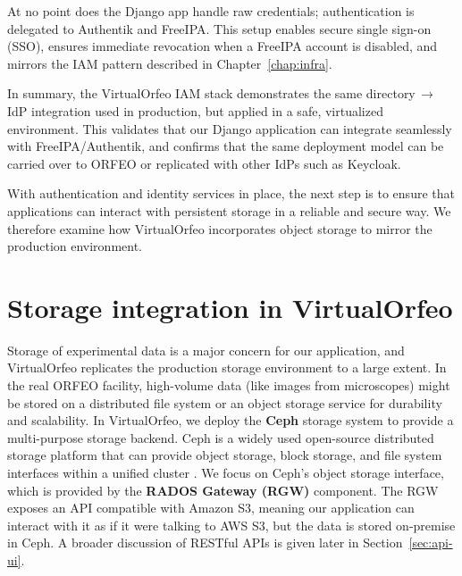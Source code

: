 At no point does the Django app handle raw credentials; authentication is 
delegated to Authentik and FreeIPA. This setup enables secure single sign-on 
(SSO), ensures immediate revocation when a FreeIPA account is disabled, and 
mirrors the IAM pattern described in Chapter~\ref{chap:infra}.

\medskip

In summary, the VirtualOrfeo IAM stack demonstrates the same 
directory\,$\rightarrow$\,IdP integration used in production, but applied in a 
safe, virtualized environment. This validates that our Django application can 
integrate seamlessly with FreeIPA/Authentik, and confirms that the same 
deployment model can be carried over to ORFEO or replicated with other IdPs such 
as Keycloak.

\medskip
\noindent With authentication and identity services in place, the next step is 
to ensure that applications can interact with persistent storage in a reliable 
and secure way. We therefore examine how VirtualOrfeo incorporates object 
storage to mirror the production environment.



\section{Storage integration in VirtualOrfeo} \label{sec:virtualorfeo-storage}

Storage of experimental data is a major concern for our application, and 
VirtualOrfeo replicates the production storage environment to a large extent. In 
the real ORFEO facility, high-volume data (like images from microscopes) might 
be stored on a distributed file system or an object storage service for 
durability and scalability. In VirtualOrfeo, we deploy the \textbf{Ceph} storage 
system to provide a multi-purpose storage backend. Ceph is a widely used 
open-source distributed storage platform that can provide object storage, block 
storage, and file system interfaces within a unified cluster 
\parencite{Weil2006Ceph}. We focus on Ceph’s object storage interface, which is 
provided by the \textbf{RADOS Gateway (RGW)} component. The RGW exposes an API 
compatible with Amazon S3, meaning our application can interact with it as if it 
were talking to AWS S3, but the data is stored on-premise in Ceph. A broader 
discussion of RESTful APIs is given later in Section~\ref{sec:api-ui}.


\medskip


